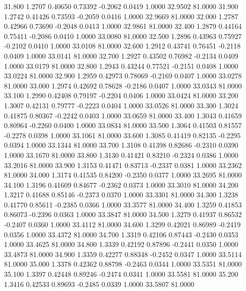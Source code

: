   31.800   1.2707   0.40650   0.73392  -0.2062   0.0419   1.0000  32.9502  81.0000
  31.900   1.2742   0.41426   0.73593  -0.2059   0.0416   1.0000  32.9669  81.0000
  32.000   1.2787   0.42966   0.73690  -0.2048   0.0413   1.0000  32.9861  81.0000
  32.400   1.2879   0.44164   0.75411  -0.2086   0.0410   1.0000  33.0080  81.0000
  32.500   1.2896   0.43963   0.75927  -0.2102   0.0410   1.0000  33.0108  81.0000
  32.600   1.2912   0.43741   0.76451  -0.2118   0.0409   1.0000  33.0141  81.0000
  32.700   1.2927   0.43502   0.76982  -0.2134   0.0409   1.0000  33.0179  81.0000
  32.800   1.2943   0.43244   0.77521  -0.2151   0.0408   1.0000  33.0224  81.0000
  32.900   1.2959   0.42973   0.78069  -0.2169   0.0407   1.0000  33.0278  81.0000
  33.000   1.2974   0.42692   0.78628  -0.2186   0.0407   1.0000  33.0343  81.0000
  33.100   1.2990   0.42408   0.79197  -0.2204   0.0406   1.0000  33.0424  81.0000
  33.200   1.3007   0.42131   0.79777  -0.2223   0.0404   1.0000  33.0526  81.0000
  33.300   1.3024   0.41875   0.80367  -0.2242   0.0403   1.0000  33.0659  81.0000
  33.400   1.3043   0.41659   0.80964  -0.2260   0.0400   1.0000  33.0834  81.0000
  33.500   1.3064   0.41503   0.81557  -0.2278   0.0398   1.0000  33.1061  81.0000
  33.600   1.3085   0.41419   0.82135  -0.2295   0.0394   1.0000  33.1344  81.0000
  33.700   1.3108   0.41398   0.82686  -0.2310   0.0390   1.0000  33.1670  81.0000
  33.800   1.3130   0.41421   0.83210  -0.2324   0.0386   1.0000  33.2016  81.0000
  33.900   1.3153   0.41471   0.83713  -0.2337   0.0381   1.0000  33.2362  81.0000
  34.000   1.3174   0.41535   0.84200  -0.2350   0.0377   1.0000  33.2695  81.0000
  34.100   1.3196   0.41609   0.84677  -0.2362   0.0373   1.0000  33.3010  81.0000
  34.200   1.3217   0.41688   0.85146  -0.2373   0.0370   1.0000  33.3301  81.0000
  34.300   1.3238   0.41770   0.85611  -0.2385   0.0366   1.0000  33.3577  81.0000
  34.400   1.3259   0.41853   0.86073  -0.2396   0.0363   1.0000  33.3847  81.0000
  34.500   1.3279   0.41937   0.86532  -0.2407   0.0360   1.0000  33.4112  81.0000
  34.600   1.3299   0.42021   0.86989  -0.2419   0.0356   1.0000  33.4372  81.0000
  34.700   1.3319   0.42106   0.87443  -0.2430   0.0353   1.0000  33.4625  81.0000
  34.800   1.3339   0.42192   0.87896  -0.2441   0.0350   1.0000  33.4873  81.0000
  34.900   1.3359   0.42277   0.88348  -0.2452   0.0347   1.0000  33.5114  81.0000
  35.000   1.3378   0.42362   0.88798  -0.2463   0.0344   1.0000  33.5351  81.0000
  35.100   1.3397   0.42448   0.89246  -0.2474   0.0341   1.0000  33.5581  81.0000
  35.200   1.3416   0.42533   0.89693  -0.2485   0.0339   1.0000  33.5807  81.0000
